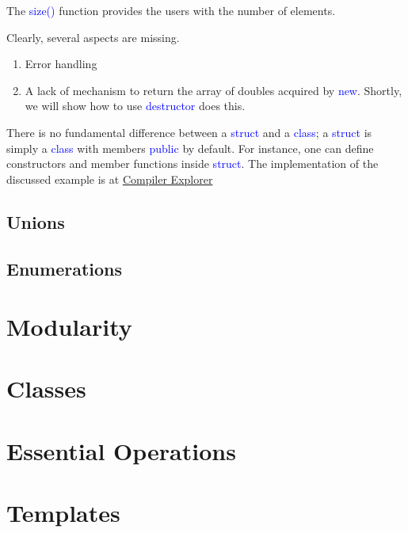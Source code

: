 \documentclass{article}
\newcommand{\be}[1]{\textcolor{blue}{#1}}
\begin{document}
The \be{size()} function provides the users with the number of elements.

Clearly, several aspects are missing.
\begin{enumerate}
	\item Error handling
	\item A lack of mechanism to return the array of doubles acquired by \be{new}. Shortly, we will show how to use \be{destructor} does this.
\end{enumerate}
There is no fundamental difference between a \be{struct} and a \be{class}; a \be{struct} is simply a \be{class} with members \be{public} by default. For instance, one can define constructors and member functions inside \be{struct}.
 The implementation of the discussed example is at 
\href{https://godbolt.org/z/E6M64s}{Compiler Explorer}
\subsection{Unions}


\subsection{Enumerations}
%

\section{Modularity}

\section{Classes}

\section{Essential Operations}

\section{Templates}
\end{document}
